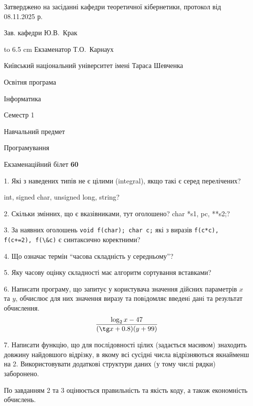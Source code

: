 \documentclass[12pt, ukrainian]{article}
\def\code#1{\Verb!#1!}
\begin{document}
{\smallskip\smallskip \begin {scriptsize} Затверджено на засіданні кафедри теоретичної кібернетики, протокол   від   08.11.2025 р.\par\smallskip\smallskip\smallskip\smallskip
{\parbox {6.5 cm} {Зав. кафедри \dotfill Ю.В.~Крак}}\hspace {0.7cm} {\hbox to 6.5 cm { Екзаменатор \dotfill Т.О.~Карнаух}} \end{scriptsize}}
\vspace{0.9cm}
{{\begin {scriptsize}\par
{ \center  Київський національний університет імені Тараса Шевченка \par}
{\parbox {5 cm}{Освітня програма \hfill}{\parbox {7 cm}{Інформатика\hfill}}\parbox {6 cm}{\hfill Семестр 1}}\par
{\parbox {5 cm} {Навчальний предмет \hfill}\parbox {7 cm}{Програмування \hfill}\parbox {6cm}{\hfill}\par}\vspace{-15pt} \end{scriptsize}}{\center Екзаменаційний білет \No \textbf { 60 }\par}}
{%
1. Які з наведених типів не є цілими (integral), якщо такі є серед перелічених?

int, signed char, unsigned long, string?
\par
\vspace{2mm}
2. Скільки змінних, що є вказівниками, тут оголошено?
char *s1, pc, **s2;?
\par
\vspace{2mm}
3. За наявних оголошень \code{void f(char); char c;} які з виразів \code{f(c*c), f(c+=2), f(\&c)} є синтаксично коректними?
\par
\vspace{2mm}
4. Що означає термін ``часова складність у середньому''?
\par
\vspace{2mm}
5. Яку часову оцінку складності має алгоритм сортування вставками?
\par
\vspace{2mm}
6. Написати програму, що запитує у користувача значення дійсних параметрів $x$ та $y$, обчислює для них значення виразу та повiдомляє введенi данi та результат обчислення.
$$\frac{\log_{2} x - 47}{(\tg x + 0.8) (y + 99)}$$ 

\par
7. Написати функцію, що для послідовності цілих (задається масивом) знаходить довжину найдовшого відрізку, в якому всі сусідні числа відрізняються якнайменш на 2. Використовувати додаткові структури даних (у тому числі рядки) заборонено.

По завданням 2 та 3 оцінюється правильність та якість коду, а також економність обчислень.

}
\end{document}
